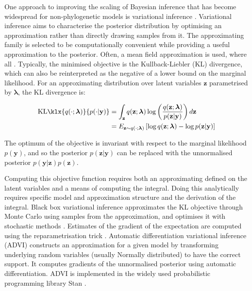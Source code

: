 \documentclass{article}
\newcommand{\kl}{\textrm{KL}\klx}
\begin{document}
One approach to improving the scaling of Bayesian inference that has become widespread for non-phylogenetic models is variational inference \cite{jordan1999introduction}. Variational inference aims to characterise the posterior distribution by optimising an approximation rather than directly drawing samples from it. The approximating family is selected to be computationally convenient while providing a useful approximation to the posterior. Often, a mean field approximation is used, where all . Typically, the minimised objective is the Kullback-Liebler (KL) divergence, which can also be reinterpreted as the negative of a lower bound on the marginal likelihood. For an approximating distribution over latent variables $\mathbf{z}$ parametrised by $\bm{\lambda}$, the KL divergence is:

\begin{align*}
\kl{q(\cdot;\bm{\lambda})}{p(\cdot|\mathbf{y})} &= \int_\mathbf{z}q(\mathbf{z};\bm{\lambda})\log\left(\frac{q(\mathbf{z};\bm{\lambda})}{p(\mathbf{z}|\mathbf{y})}\right)d\mathbf{z} \\
    &= E_{\mathbf{z}\sim q(\cdot;\bm{\lambda})}\left[ \log q(\mathbf{z};\bm{\lambda}) - \log p(\mathbf{z}|\mathbf{y})\right]
\end{align*}

The optimum of the objective is invariant with respect to the marginal likelihood $p(\mathbf{y})$, and so the posterior $p(\mathbf{z}|\mathbf{y})$ can be replaced with the unnormalised posterior $p(\mathbf{y}|\mathbf{z})p(\mathbf{z})$.

Computing this objective function requires both an approximating defined on the latent variables and a means of computing the integral. Doing this analytically requires specific model and approximation structure and the derivation of the integral. Black box variational inference \cite{ranganath2014black}approximates the KL objective through Monte Carlo using samples from the approximation, and optimises it with stochastic methods \cite{robbins1951stochastic}. Estimates of the gradient of the expectation are computed using the reparametrisation trick \cite{kingma2013auto}. Automatic differentiation variational inference (ADVI) \cite{kucukelbir2017automatic} constructs an approximation for a given model by transforming underlying random variables (usually Normally distributed) to have the correct support. It computes gradients of the unnormalised posterior using automatic differentiation. ADVI is implemented in the widely used probabilistic programming library Stan \cite{carpenter2017stan}.
\end{document}
